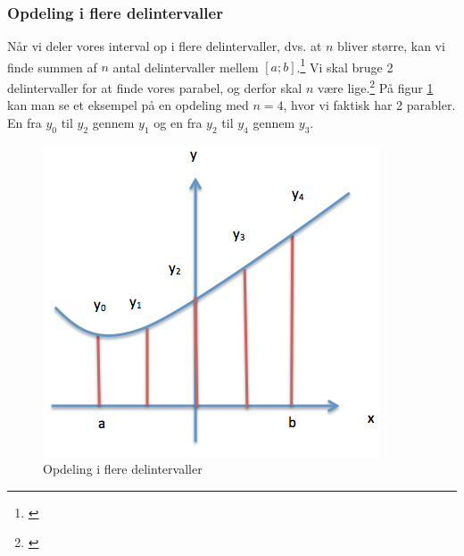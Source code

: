 \documentclass[12pt]{article}
\numberwithin{equation}{section}
\begin{document}

\subsubsection{Opdeling i flere delintervaller}
Når vi deler vores interval op i flere delintervaller, dvs. at $n$ bliver større, kan vi finde summen af $n$ antal delintervaller mellem $[a;b]$.\footnote{\cite[s. 15-16]{2012matA}} Vi skal bruge 2 delintervaller for at finde vores parabel, og derfor skal $n$ være lige.\footnote{\cite[s. 15-16]{2012matA}} På figur \ref{fig:simpsonOpdeling} kan man se et eksempel på en opdeling med $n=4$, hvor vi faktisk har 2 parabler. En fra $y_0$ til $y_2$ gennem $y_1$ og en fra $y_2$ til $y_4$ gennem $y_3$.
\label{sec:simpsonopdeling}
\begin{figure}[H]
\centering
\includegraphics[width=0.6\linewidth]{Billeder/simpsonOpdeling}
\caption{Opdeling i flere delintervaller}
\label{fig:simpsonOpdeling}
\end{figure}
\end{document}
